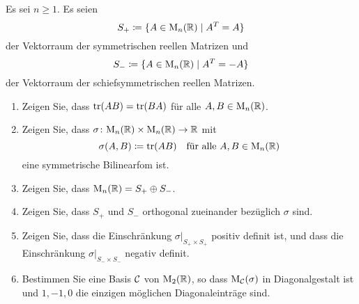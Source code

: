\documentclass[a4paper, 10pt]{scrartcl}
\begin{document}
\begin{question}
  Es sei $n \geq 1$.
  Es seien
  \[
    S_+ \coloneqq \{A \in \mathrm{M}_n(\mathbb{R}) \mid A^T = A\}
  \]
  der Vektorraum der symmetrischen reellen Matrizen und
  \[
    S_- \coloneqq \{A \in \mathrm{M}_n(\mathbb{R}) \mid A^T = -A\}
  \]
  der Vektorraum der schiefsymmetrischen reellen Matrizen.
  \begin{enumerate}[leftmargin=*]
    \item
      Zeigen Sie, dass $\operatorname{tr}(AB) = \operatorname{tr}(BA)$ für alle $A, B \in \mathrm{M}_n(\mathbb{R})$.
    \item
      Zeigen Sie, dass $\sigma \colon \mathrm{M}_n(\mathbb{R}) \times \mathrm{M}_n(\mathbb{R}) \to \mathbb{R}$ mit
      \[
        \sigma(A,B) \coloneqq \operatorname{tr}(AB)
        \quad
        \text{für alle $A, B \in \mathrm{M}_n(\mathbb{R})$}
      \]
      eine symmetrische Bilinearfom ist.
    \item
      Zeigen Sie, dass $\mathrm{M}_n(\mathbb{R}) = S_+ \oplus S_-$.
    \item
      Zeigen Sie, dass $S_+$ und $S_-$ orthogonal zueinander bezüglich $\sigma$ sind.
    \item
      Zeigen Sie, dass die Einschränkung $\sigma|_{S_+ \times S_+}$ positiv definit ist, und dass die Einschränkung $\sigma|_{S_- \times S_-}$ negativ definit.
    \item
      Bestimmen Sie eine Basis $\mathcal{C}$ von $\mathrm{M}_2(\mathbb{R})$, so dass $\mathrm{M}_{\mathcal{C}}(\sigma)$ in Diagonalgestalt ist und $1, -1, 0$ die einzigen möglichen Diagonaleinträge sind.
  \end{enumerate}
\end{question}
\end{document}

